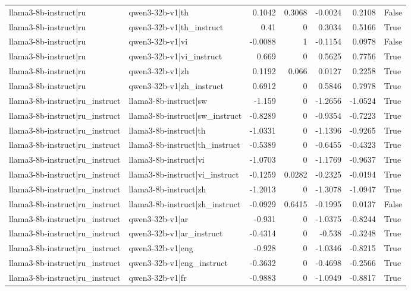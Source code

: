 \begin{table}
\begin{tabular}{l l r r r r l}
llama3-8b-instruct|ru & qwen3-32b-v1|th & 0.1042 & 0.3068 & -0.0024 & 0.2108 & False \\
llama3-8b-instruct|ru & qwen3-32b-v1|th_instruct & 0.41 & 0 & 0.3034 & 0.5166 & True \\
llama3-8b-instruct|ru & qwen3-32b-v1|vi & -0.0088 & 1 & -0.1154 & 0.0978 & False \\
llama3-8b-instruct|ru & qwen3-32b-v1|vi_instruct & 0.669 & 0 & 0.5625 & 0.7756 & True \\
llama3-8b-instruct|ru & qwen3-32b-v1|zh & 0.1192 & 0.066 & 0.0127 & 0.2258 & True \\
llama3-8b-instruct|ru & qwen3-32b-v1|zh_instruct & 0.6912 & 0 & 0.5846 & 0.7978 & True \\
llama3-8b-instruct|ru_instruct & llama3-8b-instruct|sw & -1.159 & 0 & -1.2656 & -1.0524 & True \\
llama3-8b-instruct|ru_instruct & llama3-8b-instruct|sw_instruct & -0.8289 & 0 & -0.9354 & -0.7223 & True \\
llama3-8b-instruct|ru_instruct & llama3-8b-instruct|th & -1.0331 & 0 & -1.1396 & -0.9265 & True \\
llama3-8b-instruct|ru_instruct & llama3-8b-instruct|th_instruct & -0.5389 & 0 & -0.6455 & -0.4323 & True \\
llama3-8b-instruct|ru_instruct & llama3-8b-instruct|vi & -1.0703 & 0 & -1.1769 & -0.9637 & True \\
llama3-8b-instruct|ru_instruct & llama3-8b-instruct|vi_instruct & -0.1259 & 0.0282 & -0.2325 & -0.0194 & True \\
llama3-8b-instruct|ru_instruct & llama3-8b-instruct|zh & -1.2013 & 0 & -1.3078 & -1.0947 & True \\
llama3-8b-instruct|ru_instruct & llama3-8b-instruct|zh_instruct & -0.0929 & 0.6415 & -0.1995 & 0.0137 & False \\
llama3-8b-instruct|ru_instruct & qwen3-32b-v1|ar & -0.931 & 0 & -1.0375 & -0.8244 & True \\
llama3-8b-instruct|ru_instruct & qwen3-32b-v1|ar_instruct & -0.4314 & 0 & -0.538 & -0.3248 & True \\
llama3-8b-instruct|ru_instruct & qwen3-32b-v1|eng & -0.928 & 0 & -1.0346 & -0.8215 & True \\
llama3-8b-instruct|ru_instruct & qwen3-32b-v1|eng_instruct & -0.3632 & 0 & -0.4698 & -0.2566 & True \\
llama3-8b-instruct|ru_instruct & qwen3-32b-v1|fr & -0.9883 & 0 & -1.0949 & -0.8817 & True \\

\end{tabular}
\end{table}

